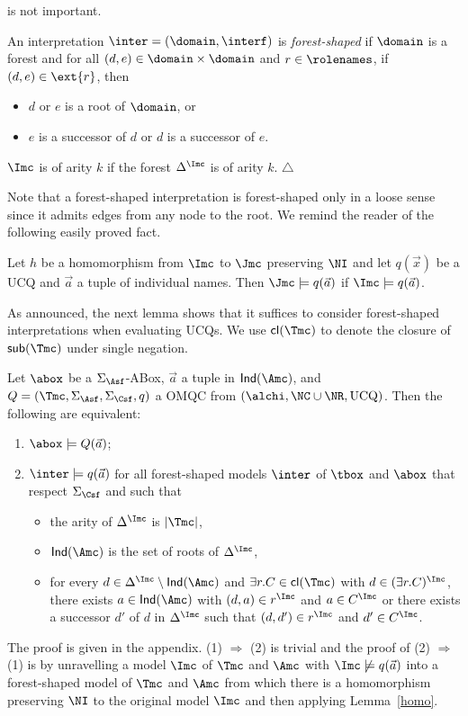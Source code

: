 \documentclass{lmcs}
\theoremstyle{definition}
\begin{document}
is not important.
%
\begin{defi}
  An interpretation $\inter=(\domain,\interf)$ is \emph{forest-shaped} 
  if $\domain$ is a forest and for all $(d,e)\in\domain\times\domain$ 
  and $r\in\rolenames$, if $(d,e)\in\ext{r}$, then
  \begin{itemize}
  \item $d$ or $e$ is a root of $\domain$, or
  \item $e$ is a successor of $d$ or $d$ is a successor of $e$.
  \end{itemize}
  $\Imc$ is of arity $k$ if the forest $\Delta^{\Imc}$ is of arity
  $k$.
  \hfill$\triangle$
\end{defi}
%

\smallskip
\noindent
Note that a forest-shaped interpretation is forest-shaped only in a
loose sense since it admits edges from any node to the root.  We
remind the reader of the following easily proved fact.
%
\begin{lem}
\label{homo}
Let $h$ be a homomorphism from $\Imc$ to $\Jmc$ preserving $\NI$ and let $q(\vec{x})$ be a UCQ 
and $\vec{a}$ a tuple of individual names. Then $\Jmc\models q(\vec{a})$ if $\Imc\models q(\vec{a})$. 
\end{lem}
%
As announced, the next lemma shows that it suffices to consider forest-shaped interpretations
when evaluating UCQs. We use 
${\sf cl}(\Tmc)$ to denote the closure of ${\sf sub}(\Tmc)$ under 
single negation.  
%
\begin{lem}\label{lem:alchi_forest_model}
  Let $\abox$ be a $\Sigma_{\Asf}$-ABox, $\vec{a}$ a tuple in ${\sf Ind}(\Amc)$, and
  $Q=(\Tmc,\Sigma_\Asf,\Sigma_\Csf,q)$ a OMQC from $(\alchi,\NC \cup
  \NR,\text{UCQ})$. Then the following are equivalent:
  \begin{enumerate}
  \item $\abox\models Q(\vec{a})$;
  \item $\inter\models q(\vec{a})$ for all forest-shaped models $\inter$ of $\tbox$ and $\abox$ that respect $\Sigma_\Csf$ and such that
     \begin{itemize}
            \item the arity of $\Delta^{\Imc}$ is $|\Tmc|$, 
            \item ${\sf Ind}(\Amc)$ is the set of roots of $\Delta^{\Imc}$,
            \item for every $d\in \Delta^{\Imc}\setminus {\sf Ind}(\Amc)$ and $\exists r.C\in {\sf cl}(\Tmc)$ with $d\in (\exists r.C)^{\Imc}$, there exists $a\in {\sf Ind}(\Amc)$ with $(d,a)\in r^{\Imc}$ and $a\in C^{\Imc}$ or 
there exists a successor $d'$ of $d$ in $\Delta^{\Imc}$
                  such that $(d,d')\in r^{\Imc}$ and $d'\in C^{\Imc}$.
     \end{itemize} 
  \end{enumerate}
\end{lem}
The proof is given in the appendix. (1) $\Rightarrow$ (2) is trivial and the proof of (2) $\Rightarrow$ (1) 
is by unravelling a model $\Imc$ of $\Tmc$ and $\Amc$ with $\Imc\not\models q(\vec{a})$ into a forest-shaped model 
of $\Tmc$ and $\Amc$ from which there is a homomorphism preserving $\NI$ to the original model $\Imc$ and
then applying Lemma~\ref{homo}.
\end{document}
